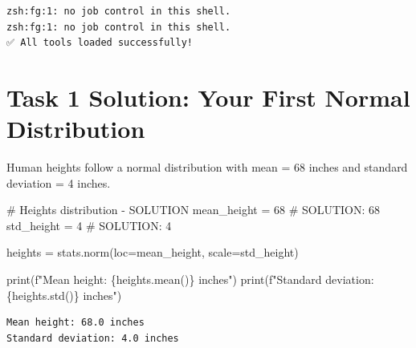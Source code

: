 \documentclass[
  letterpaper,
  DIV=11,
  numbers=noendperiod]{scrartcl}
\newenvironment{Shaded}{\begin{snugshade}}{\end{snugshade}}
\newcommand{\BuiltInTok}[1]{\textcolor[rgb]{0.00,0.23,0.31}{#1}}
\newcommand{\CommentTok}[1]{\textcolor[rgb]{0.37,0.37,0.37}{#1}}
\newcommand{\DecValTok}[1]{\textcolor[rgb]{0.68,0.00,0.00}{#1}}
\newcommand{\NormalTok}[1]{\textcolor[rgb]{0.00,0.23,0.31}{#1}}
\newcommand{\OperatorTok}[1]{\textcolor[rgb]{0.37,0.37,0.37}{#1}}
\newcommand{\SpecialCharTok}[1]{\textcolor[rgb]{0.37,0.37,0.37}{#1}}
\newcommand{\SpecialStringTok}[1]{\textcolor[rgb]{0.13,0.47,0.30}{#1}}
\begin{document}
\begin{verbatim}
zsh:fg:1: no job control in this shell.
zsh:fg:1: no job control in this shell.
✅ All tools loaded successfully!
\end{verbatim}

\section{Task 1 Solution: Your First Normal
Distribution}\label{task-1-solution-your-first-normal-distribution}

Human heights follow a normal distribution with mean = 68 inches and
standard deviation = 4 inches.

\begin{Shaded}
\begin{Highlighting}[]
\CommentTok{\# Heights distribution {-} SOLUTION}
\NormalTok{mean\_height }\OperatorTok{=} \DecValTok{68}  \CommentTok{\# SOLUTION: 68}
\NormalTok{std\_height }\OperatorTok{=} \DecValTok{4}    \CommentTok{\# SOLUTION: 4}

\NormalTok{heights }\OperatorTok{=}\NormalTok{ stats.norm(loc}\OperatorTok{=}\NormalTok{mean\_height, scale}\OperatorTok{=}\NormalTok{std\_height)}

\BuiltInTok{print}\NormalTok{(}\SpecialStringTok{f"Mean height: }\SpecialCharTok{\{}\NormalTok{heights}\SpecialCharTok{.}\NormalTok{mean()}\SpecialCharTok{\}}\SpecialStringTok{ inches"}\NormalTok{)}
\BuiltInTok{print}\NormalTok{(}\SpecialStringTok{f"Standard deviation: }\SpecialCharTok{\{}\NormalTok{heights}\SpecialCharTok{.}\NormalTok{std()}\SpecialCharTok{\}}\SpecialStringTok{ inches"}\NormalTok{)}
\end{Highlighting}
\end{Shaded}

\begin{verbatim}
Mean height: 68.0 inches
Standard deviation: 4.0 inches
\end{verbatim}
\end{document}

